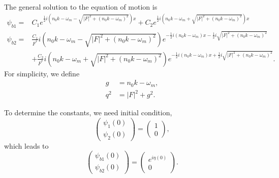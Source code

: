 The general solution to the equation of motion is
\begin{align}
   \psi_{b1} = & C_1 e^{\frac{1}{2} i \left( n_0 k -\omega_m - \sqrt{  \lvert F \rvert^2 +  (n_0 k -\omega_m)^2 } \right)x} + C_2 e^{\frac{1}{2} i \left( n_0 k -\omega_m + \sqrt{  \lvert F \rvert^2 +  (n_0 k -\omega_m)^2 } \right)x} \\
   \psi_{b2} = & \frac{C_1}{F^*} i \left( n_0 k - \omega_m - \sqrt{ \lvert F\rvert^2 + ( n_0 k - \omega_m )^2 } \right) e^{ -\frac{1}{2}i (n_0 k - \omega_m ) x - \frac{1}{2} i \sqrt{ \lvert F \rvert^2 + (n_0 k - \omega_m )^2 }  } \nonumber\\
   & + \frac{C_2}{F^*} i \left( n_0 k - \omega_m + \sqrt{ \lvert F\rvert^2 + ( n_0 k - \omega_m )^2 }  \right)   e^{ -\frac{1}{2}i (n_0 k - \omega_m ) x + \frac{1}{2} i \sqrt{ \lvert F \rvert^2 + (n_0 k - \omega_m )^2 }  } .
\end{align}
For simplicity, we define
\begin{align}
   g &= n_0 k  - \omega_m, \\
   q^2 &= \lvert F \rvert^2 + g^2.
   \label{chap:matter-sec:deep-jacobi-subsec:single-matter-freq-eqn:definition-g-q}
\end{align}

To determine the constants, we need initial condition,
\begin{equation}
   \begin{pmatrix} \psi_1 (0) \\ \psi_2(0)  \end{pmatrix} = \begin{pmatrix} 1 \\ 0  \end{pmatrix} ,
\end{equation}
which leads to
\begin{equation}
   \begin{pmatrix} \psi_{b1} (0) \\ \psi_{b2}(0)  \end{pmatrix} = \begin{pmatrix} e^{i\eta(0)} \\ 0  \end{pmatrix}.
\end{equation}

